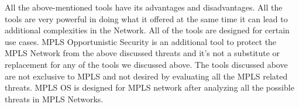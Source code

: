       All the above-mentioned tools have its advantages and disadvantages. All the tools are very powerful in doing what it offered at the same time it can lead to additional complexities in the Network. All of the tools are designed for certain use cases. MPLS Opportunistic Security is an additional tool to protect the MPLS Network from the above discussed threats and it's not a substitute or replacement for any of the tools we discussed above. The tools discussed above are not exclusive to MPLS and not desired by evaluating all the MPLS related threats. MPLS OS is designed for MPLS network after analyzing all the possible threats in MPLS Networks. 
 
 
     

 
 
    
    

 


 

